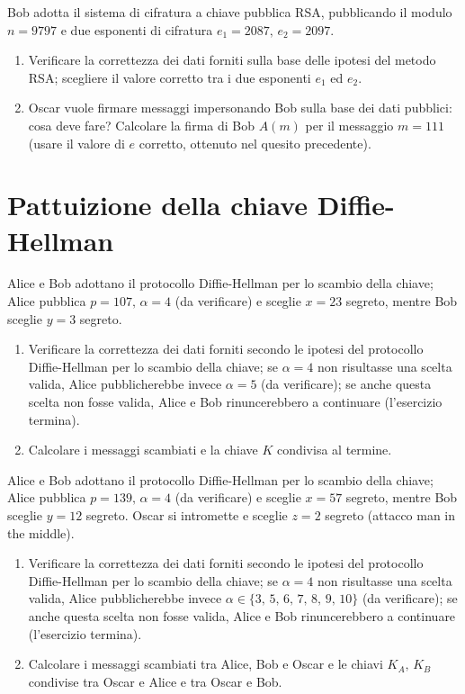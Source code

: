         Bob adotta il sistema di cifratura a chiave pubblica RSA, pubblicando il modulo $n=9797$ e 
        due esponenti di cifratura $e_1=2087,\,e_2=2097$.
        \begin{enumerate}
            \item Verificare la correttezza dei dati forniti sulla base delle ipotesi del metodo RSA; 
                scegliere il valore corretto tra i due esponenti $e_1$ ed $e_2$.
            \item Oscar vuole firmare messaggi impersonando Bob sulla base dei dati pubblici: cosa deve 
                fare? Calcolare la firma di Bob $A(m)$ per il messaggio $m=111$ (usare il valore di $e$ 
                corretto, ottenuto nel quesito precedente).
        \end{enumerate}

    \bigskip
    \section{Pattuizione della chiave Diffie-Hellman}
        Alice e Bob adottano il protocollo Diffie-Hellman per lo scambio della chiave; Alice pubblica 
        $p=107,\, \alpha=4$ (da verificare) e sceglie $x=23$ segreto, mentre Bob sceglie $y=3$ segreto.
        \begin{enumerate}
            \item Verificare la correttezza dei dati forniti secondo le ipotesi del protocollo Diffie-Hellman 
                per lo scambio della chiave; se $\alpha=4$ non risultasse una scelta valida, Alice 
                pubblicherebbe invece $\alpha=5$ (da verificare); se anche questa scelta non fosse valida, Alice e Bob 
                rinuncerebbero a continuare (l'esercizio termina).
            \item Calcolare i messaggi scambiati e la chiave $K$ condivisa al termine.
        \end{enumerate}

        Alice e Bob adottano il protocollo Diffie-Hellman per lo scambio della chiave; Alice pubblica 
        $p=139,\, \alpha=4$ (da verificare) e sceglie $x=57$ segreto, mentre Bob sceglie $y=12$ segreto. Oscar 
        si intromette e sceglie $z=2$ segreto (attacco man in the middle).
        \begin{enumerate}
            \item Verificare la correttezza dei dati forniti secondo le ipotesi del protocollo Diffie-Hellman 
                per lo scambio della chiave; se $\alpha=4$ non risultasse una scelta valida, Alice 
                pubblicherebbe invece $\alpha \in \{3,\,5,\,6,\,7,\,8,\,9,\,10\}$ (da verificare); se anche 
                questa scelta non fosse valida, Alice e Bob rinuncerebbero a continuare (l'esercizio termina).
            \item Calcolare i messaggi scambiati tra Alice, Bob e Oscar e le chiavi $K_A,\,K_B$ condivise tra 
                Oscar e Alice e tra Oscar e Bob.
        \end{enumerate}

